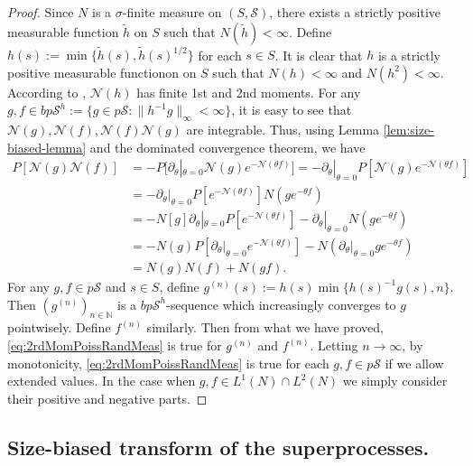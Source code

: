 \begin{proof}
	Since $N$ is a $\sigma$-finite measure on $(S, \mathscr S)$, there exists a strictly positive measurable function $\tilde h$ on $S$ such that $N(\tilde h)<\infty$.
	Define $h(s) := \min\{ \tilde h(s), \tilde h(s)^{1/2} \}$ for each $s \in S$.
	It is clear that $h$ is a strictly positive measurable functionon on $S$ such that $N(h) < \infty$ and $N(h^2) < \infty$.
	According to \cite[Theorem 2.7]{Kyprianou2014Fluctuations}, $\mathcal N(h)$ has finite 1st and 2nd moments.
	For any $g, f \in bp\mathscr S^h := \{g \in p\mathscr S: \|h^{-1} g\|_\infty < \infty\}$, it is easy to see that $\mathcal N(g), \mathcal N(f), \mathcal N(f) \mathcal N(g)$ are integrable.
	Thus, using Lemma \ref{lem:size-biased-lemma} and the dominated convergence theorem, we have
\[\begin{split}
	P [\mathcal N(g) \mathcal N(f)]
	&= - P[\partial_\theta|_{\theta = 0} \mathcal N(g) e^{-\mathcal N(\theta f)}]
	= - \partial_\theta|_{\theta = 0} P[\mathcal N(g) e^{-\mathcal N(\theta f)}]\\
	&= - \partial_\theta|_{\theta = 0} P[e^{-\mathcal N(\theta f)}]N(ge^{-\theta f})\\
	&= - N[g] \partial_\theta|_{\theta = 0} P[e^{-\mathcal N(\theta f)}] - \partial_\theta|_{\theta = 0} N(ge^{- \theta f}) \\
	&= - N(g) P[ \partial_\theta|_{\theta = 0} e^{-\mathcal N(\theta f)}] - N( \partial_\theta|_{\theta = 0} g e^{-\theta f}) \\
	&= N(g) N(f) + N(g f).
\end{split}\]
	For any $g,f\in p\mathscr S$ and $s \in S$, define $g^{(n)}(s) := h(s) \min\{h(s)^{-1}g(s),n\}$.
	Then $(g^{(n)})_{n\in \mathbb N}$ is a $bp\mathscr S^h$-sequence which increasingly converges to $g$ pointwisely.
	Define $f^{(n)}$ similarly.
	Then from what we have proved, \eqref{eq:2rdMomPoissRandMeas} is true for $g^{(n)}$ and $f^{(n)}$.
	Letting $n\to\infty$, by monotonicity, \eqref{eq:2rdMomPoissRandMeas} is true for each $g,f\in p\mathscr S$ if we allow extended values.
	In the case when $g,f\in L^1(N) \cap L^2(N)$ we simply consider their positive and negative parts.
\end{proof}

\subsection{Size-biased transform of the superprocesses.}

